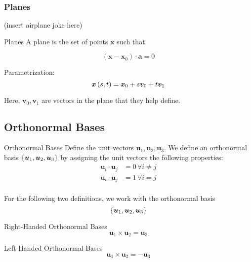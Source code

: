 \documentclass[11pt]{article}
\begin{document}
\subsubsection{Planes}
(insert airplane joke here)


\begin{definition}{Planes}
  A plane is the set of points $\bm{x}$ such that
  
  $$(\bm{x} - \bm{x}_0) \cdot \bm{a} = 0$$

  Parametrization:
  $$\bm{x} \left ( s, t \right) = \bm{x}_0 + s \bm{v}_0 + t \bm{v}_1$$

  Here, $\bm{v}_0, \bm{v}_1$ are vectors in the plane that they help define.
  
\end{definition}







\subsection{Orthonormal Bases}

\begin{definition}{Orthonormal Bases}
  Define the unit vectors $\bm{u}_1, \bm{u}_2, \bm{u}_3$.
  We define an orthonormal basis $\left \{ \bm{u}_1, \bm{u}_2, \bm{u}_3 \right \}$ by assigning the unit vectors the following properties:
  \begin{align*}
    \bm{u}_i \cdot \bm{u}_j &= 0\, \forall i \neq j \\
    \bm{u}_i \cdot \bm{u}_j &= 1\, \forall i = j \\
  \end{align*}
\end{definition}

For the following two definitions, we work with the orthonormal basis
$$\left \{ \bm{u}_1, \bm{u}_2, \bm{u}_3 \right \}$$

\begin{definition}{Right-Handed Orthonormal Bases}
  $$
  \bm{u}_1 \times \bm{u}_2 = \bm{u}_3
  $$
\end{definition}

\begin{definition}{Left-Handed Orthonormal Bases}
  $$
  \bm{u}_1 \times \bm{u}_2 = - \bm{u}_3
  $$
\end{definition}



\end{document}
